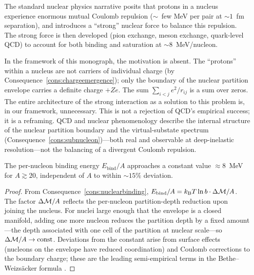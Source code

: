 \begin{remark}
\label{rem:coulombparadox}
The standard nuclear physics narrative posits that protons in a nucleus
experience enormous mutual Coulomb repulsion ($\sim$~few MeV per pair at
$\sim 1$~fm separation), and introduces a ``strong'' nuclear force to balance
this repulsion.  The strong force is then developed (pion exchange, meson
exchange, quark-level QCD) to account for both binding and saturation at
$\sim 8$~MeV/nucleon.

In the framework of this monograph, the motivation is absent.  The
``protons'' within a nucleus are not carriers of individual charge (by
Consequence~\ref{cons:chargeemergence}); only the boundary of the nuclear
partition envelope carries a definite charge $+Ze$.  The sum
$\sum_{i<j}e^{2}/r_{ij}$ is a sum over zeros.  The entire architecture of the
strong interaction as a solution to this problem is, in our framework,
unnecessary.  This is not a rejection of QCD's empirical success; it is a
reframing.  QCD and nuclear phenomenology describe the internal structure of
the nuclear partition boundary and the virtual-substate spectrum
(Consequence~\ref{cons:subnucleon})---both real and observable at
deep-inelastic resolution---not the balancing of a divergent Coulomb repulsion.
\end{remark}

\begin{corollary}
\label{cor:saturation}
The per-nucleon binding energy $E_{\mathrm{bind}}/A$ approaches a constant
value $\approx 8$~MeV for $A\gtrsim 20$, independent of $A$ to within
$\sim 15\%$ deviation.
\end{corollary}

\begin{proof}
From Consequence~\ref{cons:nuclearbinding},
$E_{\mathrm{bind}}/A = k_{\mathrm{B}} T\ln b\cdot\Delta\mathcal{M}/A$.  The factor
$\Delta\mathcal{M}/A$ reflects the per-nucleon partition-depth reduction upon
joining the nucleus.  For nuclei large enough that the envelope is a closed
manifold, adding one more nucleon reduces the partition depth by a fixed
amount---the depth associated with one cell of the partition at nuclear
scale---so $\Delta\mathcal{M}/A\to\mathrm{const}$.  Deviations from the constant
arise from surface effects (nucleons on the envelope have reduced
coordination) and Coulomb corrections to the boundary charge; these are the
leading semi-empirical terms in the Bethe--Weizs\"acker formula
\citep{krane1988}.
\end{proof}

